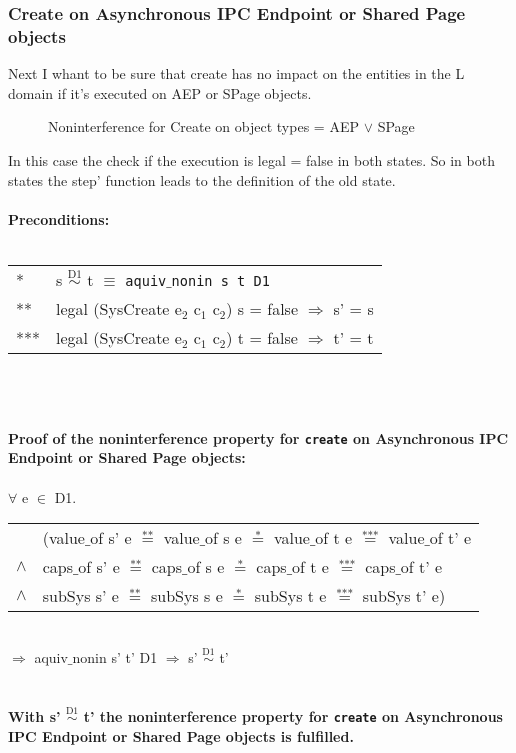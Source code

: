 \subsubsection{Create on Asynchronous IPC Endpoint or Shared Page objects}
Next I whant to be sure that create has no impact on the entities in the L domain if it's executed on AEP or SPage objects.\\
\begin{flushleft}
\begin{figure}[H]
\caption{Noninterference for Create on object types = AEP $\vee$ SPage}
\end{figure}
\end{flushleft} 
In this case the check if the execution is legal = false in both states. So in both states the step' function leads to the definition of the old state. \\ \\
\textbf{Preconditions:} \\ \\
\begin{tabular}{ll}
* & s $\overset{\text{D1}}{\sim}$ t $\equiv$ \texttt{aquiv$\_$nonin s t D1}	\\ 
** & legal (SysCreate e$_2$ c$_1$ c$_2$) s = false $\Rightarrow$ s' = s \\ 
*** & legal (SysCreate e$_2$ c$_1$ c$_2$) t = false $\Rightarrow$ t' = t
\end{tabular}\\ \\ \\
\textbf{Proof of the noninterference property for \texttt{create} on Asynchronous IPC Endpoint or Shared Page objects:}\\ \\
$\forall$ e $\in$ D1. \\ 
\begin{tabular}{ll}
& (value$\_$of s' e $\overset{\text{**}}{=}$ value$\_$of s e $\overset{\text{*}}{=}$ value$\_$of t e $\overset{\text{***}}{=}$ value$\_$of t' e \\
$\wedge$ & caps$\_$of s' e $\overset{\text{**}}{=}$ caps$\_$of s e $\overset{\text{*}}{=}$ caps$\_$of t e $\overset{\text{***}}{=}$ caps$\_$of t' e \\
$\wedge$ & subSys s' e $\overset{\text{**}}{=}$ subSys s e $\overset{\text{*}}{=}$ subSys t e $\overset{\text{***}}{=}$ subSys t' e)
\end{tabular} \\
$\Rightarrow$ aquiv$\_$nonin s' t' D1 $\Rightarrow$ s' $\overset{\text{D1}}{\sim}$ t' \\ \\ \\
\textbf{With s' $\overset{\text{D1}}{\sim}$ t' the noninterference property for \texttt{create} on Asynchronous IPC Endpoint or Shared Page objects is fulfilled.} 